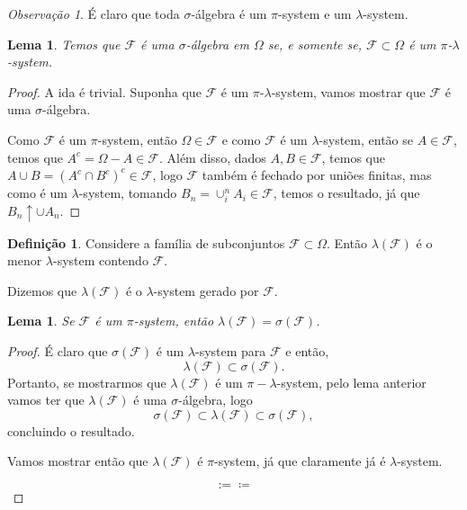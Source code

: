 \documentclass[12pt,a4paper,oneside]{book}
\newtheorem{lemma}[theorem]{Lema}
\theoremstyle{definition}
\newtheorem{definition}[theorem]{Defini\c{c}\~ao}
\theoremstyle{remark}
\newtheorem{remark}[theorem]{Observa\c{c}\~ao}
\numberwithin{equation}{section}
\newcommand{\F}{\mathcal{F}}
\begin{document}
\begin{remark}
É claro que toda $\sigma$-álgebra é um $\pi$-system e um $\lambda$-system.
\end{remark}

\begin{lemma}
Temos que $\mathcal{F}$ é uma $\sigma$-álgebra em $\Omega$ se, e somente  se, $\mathcal{F}\subset \Omega$ é um $\pi$-$\lambda$-system. 
\end{lemma}

\begin{proof}
A ida é trivial. Suponha que $\mathcal{F}$ é um $\pi$-$\lambda$-system, vamos mostrar que $\mathcal{F}$ é uma $\sigma$-álgebra.

Como $\mathcal{F}$ é um $\pi$-system, então $\Omega\in \mathcal{F}$ e como $\mathcal{F}$ é um $\lambda$-system, então se $A\in \mathcal{F}$, temos que $A^c = \Omega-A\in \mathcal{F} $. Além disso, dados $A,B\in \mathcal{F}$, temos que $A\cup B = (A^c\cap B^c)^c\in \mathcal{F}$, logo $\mathcal{F}$ também é fechado por uniões finitas, mas como é um $\lambda$-system, tomando $B_n = \cup^n_i A_i\in \mathcal{F}$, temos o resultado, já que $B_n\uparrow \cup A_n$.

\end{proof}

\begin{definition}
Considere a família de subconjuntos $\mathcal{F}\subset \Omega$. Então $\lambda(\mathcal{F})$ é o menor $\lambda$-system contendo $\mathcal{F}$. 

Dizemos que $\lambda(\mathcal{F})$ é o $\lambda$-system gerado por $\mathcal{F}$.
\end{definition}

\begin{lemma}
Se $\F$ é um $\pi$-system, então  $\lambda(\F) = \sigma(\F)$.
\end{lemma}
\begin{proof}
É claro que $\sigma(\F)$ é um $\lambda$-system para $\F$ e então,
$$\lambda(\F)\subset \sigma(\F). $$
Portanto, se mostrarmos que $\lambda(\F)$ é um $\pi-\lambda$-system, pelo lema anterior vamos ter que $\lambda(\F)$ é uma $\sigma$-álgebra, logo 
$$\sigma(\F)\subset \lambda(\F) \subset \sigma(\F), $$ concluindo o resultado.

Vamos mostrar então que $\lambda(\F)$ é $\pi$-system, já que claramente já é $\lambda$-system.


\[:= \coloneqq\]

\end{proof}
\end{document}
